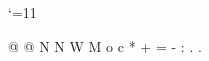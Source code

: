 \catcode`\@=11

\expandafter\gdef\csname dtAC0\endcsname{@}
\expandafter\gdef\csname dtAC1\endcsname{@}
\expandafter\gdef\csname dtAC2\endcsname{N}
\expandafter\gdef\csname dtAC3\endcsname{N}
\expandafter\gdef\csname dtAC4\endcsname{W}
\expandafter\gdef\csname dtAC5\endcsname{M}
\expandafter\gdef\csname dtAC6\endcsname{o}
\expandafter\gdef\csname dtAC7\endcsname{c}
\expandafter\gdef\csname dtAC8\endcsname{*}
\expandafter\gdef\csname dtAC9\endcsname{+}
\expandafter\gdef\csname dtACA\endcsname{=}
\expandafter\gdef\csname dtACB\endcsname{-}
\expandafter\gdef\csname dtACC\endcsname{:}
\expandafter\gdef\csname dtACD\endcsname{.}
\expandafter\gdef\csname dtACE\endcsname{.}
\expandafter\gdef\csname dtACF\endcsname{ }

